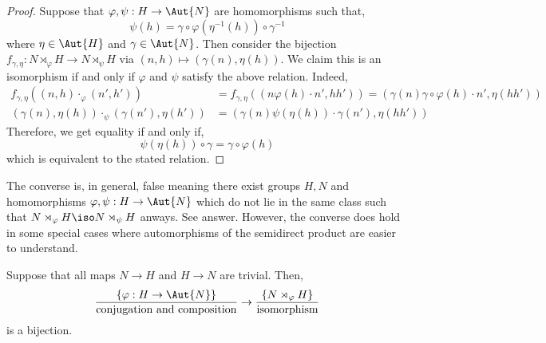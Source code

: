 \documentclass[12pt]{article}
\begin{document}
\begin{proof}
Suppose that $\varphi, \psi : H \to \Aut{N}$ are homomorphisms such that,
\[ \psi(h) = \gamma \circ \varphi(\eta^{-1}(h)) \circ \gamma^{-1} \]
where $\eta \in \Aut{H}$ and $\gamma \in \Aut{N}$. Then consider the bijection $f_{\gamma, \eta} : N \rtimes_\varphi H \to N \rtimes_\psi H$ via $(n, h) \mapsto (\gamma(n), \eta(h))$. We claim this is an isomorphism if and only if $\varphi$ and $\psi$ satisfy the above relation. Indeed,
\begin{align*}
f_{\gamma, \eta}((n, h) \cdot_\varphi (n', h')) & = f_{\gamma, \eta}((n \varphi(h) \cdot n', h h')) = (\gamma(n) \gamma \circ \varphi(h) \cdot n', \eta(h h'))
\\
(\gamma(n), \eta(h)) \cdot_{\psi} (\gamma(n'), \eta(h')) & = (\gamma(n) \psi(\eta(h)) \cdot \gamma(n'), \eta(h h'))
\end{align*}
Therefore, we get equality if and only if,
\[ \psi(\eta(h)) \circ \gamma = \gamma \circ \varphi(h) \]
which is equivalent to the stated relation.
\end{proof}

\begin{rmk}
The converse is, in general, false meaning there exist groups $H, N$ and homomorphisms $\varphi, \psi : H \to \Aut{N}$ which do not lie in the same class such that $N \rtimes_\varphi H \iso N \rtimes_\psi H$ anways. See  answer. However, the converse does hold in some special cases where automorphisms of the semidirect product are easier to understand. 
\end{rmk}
 
\begin{prop}
Suppose that all maps $N \to H$ and $H \to N$ are trivial. Then,
\[ \frac{\{ \varphi : H \to \Aut{N} \}}{\text{conjugation and composition}} \to \frac{\{ N \rtimes_\varphi H \}}{\text{isomorphism}} \]
is a bijection. 
\end{prop}
\end{document}
